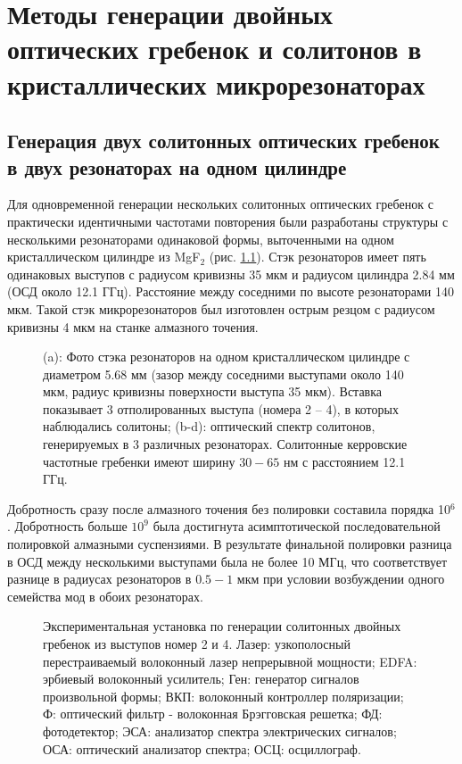 \chapter{Методы генерации двойных оптических гребенок и солитонов в кристаллических микрорезонаторах} \label{chapt4}

\section{Генерация двух солитонных оптических гребенок в двух резонаторах на одном цилиндре}

Для одновременной генерации нескольких солитонных оптических гребенок \cite{Pavlov2017} с практически идентичными частотами повторения были разработаны структуры с несколькими резонаторами одинаковой формы, выточенными на одном кристаллическом цилиндре из MgF$_2$ (рис. \ref{ris:image1}). Стэк резонаторов имеет пять одинаковых выступов с радиусом кривизны 35 мкм и радиусом цилиндра 2.84 мм (ОСД около 12.1 ГГц). Расстояние между соседними по высоте резонаторами 140 мкм. Такой стэк микрорезонаторов был изготовлен острым резцом с радиусом кривизны 4 мкм на станке алмазного точения.

\begin{figure}[!htb]
\begin{minipage}{1\linewidth}
\end{minipage}
\caption{(a): Фото стэка резонаторов на одном кристаллическом цилиндре с диаметром 5.68 мм (зазор между соседними выступами около 140 мкм, радиус кривизны поверхности выступа 35 мкм). Вставка показывает 3 отполированных выступа (номера 2 -- 4), в которых наблюдались солитоны; (b-d): оптический спектр солитонов, генерируемых в 3 различных резонаторах. Солитонные керровские частотные гребенки имеют ширину $30 - 65$ нм с расстоянием 12.1 ГГц.}
\label{ris:image1}
\end{figure}

Добротность сразу после алмазного точения без полировки составила порядка 10$^6$. Добротность больше $10^9$ была достигнута асимптотической последовательной полировкой алмазными суспензиями. В результате финальной полировки разница в ОСД между несколькими выступами была не более 10 МГц, что соответствует разнице в радиусах резонаторов в $0.5 - 1$ мкм при условии возбуждении одного семейства мод в обоих резонаторах.

\begin{figure}[!htb]
\begin{minipage}{1\linewidth}
\end{minipage}
\caption{Экспериментальная установка по генерации солитонных двойных гребенок из выступов номер 2 и 4. Лазер: узкополосный перестраиваемый волоконный лазер непрерывной мощности; EDFA: эрбиевый волоконный усилитель; Ген: генератор сигналов произвольной формы; ВКП:  волоконный контроллер поляризации; Ф: оптический фильтр - волоконная Брэгговская решетка; ФД: фотодетектор; ЭСА: анализатор спектра электрических сигналов; ОСА: оптический анализатор спектра; ОСЦ: осциллограф.}
\label{ris:image2}
\end{figure}

